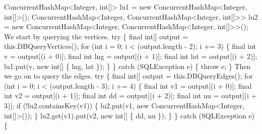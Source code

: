 \nwendcode{}
\nwenddocs{}\plusendmoddef
  ConcurrentHashMap<Integer, int[]>    lu1 = new ConcurrentHashMap<Integer, int[]>();
  ConcurrentHashMap<Integer,
    ConcurrentHashMap<Integer, int[]>> lu2 = new ConcurrentHashMap<Integer, ConcurrentHashMap<Integer, int[]>>();
\nwendcode{}\nwdocspar
{\small We start by querying the vertices.}
\nwenddocs{}\plusendmoddef
  try \{
    final int[] output = this.DBQueryVertices();
    for (int i = 0; i < (output.length - 2); i += 3) \{
      final int   v = output[(i + 0)];
      final int lng = output[(i + 1)];
      final int lat = output[(i + 2)];
      lu1.put(v, new int[] \{ lng, lat \});
    \}
  \} catch (SQLException e) \{
    throw e;
  \}
\nwendcode{}\nwdocspar
{\small Then we go on to query the edges.}
\nwenddocs{}\plusendmoddef
  try \{
    final int[] output = this.DBQueryEdges();
    for (int i = 0; i < (output.length - 3); i += 4) \{
      final int v1 = output[(i + 0)];
      final int v2 = output[(i + 1)];
      final int dd = output[(i + 2)];
      final int nu = output[(i + 3)];
      if (!lu2.containsKey(v1)) \{
        lu2.put(v1, new ConcurrentHashMap<Integer, int[]>());
      \}
      lu2.get(v1).put(v2, new int[] \{ dd, nu \});
    \}
  \} catch (SQLException e) \{
